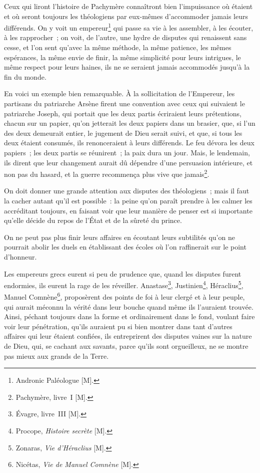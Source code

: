 \documentclass[french,twoside]{book} %
\begin{document}
Ceux qui liront l’histoire de Pachymère connaîtront bien l’impuissance où étaient et où seront toujours les théologiens par eux-mêmes d’accommoder jamais leurs différends. On y voit un empereur\footnote{Andronic Paléologue [M].} qui passe sa vie à les assembler, à les écouter, à les rapprocher ; on voit, de l’autre, une hydre de disputes qui renaissent sans cesse, et l’on sent qu’avec la même méthode, la même patience, les mêmes espérances, la même envie de finir, la même simplicité pour leurs intrigues, le même respect pour leurs haines, ils ne se seraient jamais accommodés jusqu’à la fin du monde.\par
En voici un exemple bien remarquable. À la sollicitation de l’Empereur, les partisans du patriarche Arsène firent une convention avec ceux qui suivaient le patriarche Joseph, qui portait que les deux partis écriraient leurs prétentions, chacun sur un papier, qu’on jetterait les deux papiers dans un brasier, que, si l’un des deux demeurait entier, le jugement de Dieu serait suivi, et que, si tous les deux étaient consumés, ils renonceraient à leurs différends. Le feu dévora les deux papiers ; les deux partis se réunirent ; la paix dura un jour. Mais, le lendemain, ils dirent que leur changement aurait dû dépendre d’une persuasion intérieure, et non pas du hasard, et la guerre recommença plus vive que jamais\footnote{Pachymère, livre I [M].}.\par
On doit donner une grande attention aux disputes des théologiens ; mais il faut la cacher autant qu’il est possible : la peine qu’on paraît prendre à les calmer les accréditant toujours, en faisant voir que leur manière de penser est si importante qu’elle décide du repos de l’État et de la sûreté du prince.\par
On ne peut pas plus finir leurs affaires en écoutant leurs subtilités qu’on ne pourrait abolir les duels en établissant des écoles où l’on raffinerait sur le point d’honneur.\par
Les empereurs grecs eurent si peu de prudence que, quand les disputes furent endormies, ils eurent la rage de les réveiller. Anastase\footnote{Évagre, livre III [M].}, Justinien\footnote{Procope, {\itshape Histoire secrète} [M].}, Héraclius\footnote{Zonaras, {\itshape Vie d’Héraclius} [M].}, Manuel Comnène\footnote{Nicétas, {\itshape Vie de Manuel Comnène} [M].}, proposèrent des points de foi à leur clergé et à leur peuple, qui aurait méconnu la vérité dans leur bouche quand même ils l’auraient trouvée. Ainsi, péchant toujours dans la forme et ordinairement dans le fond, voulant faire voir leur pénétration, qu’ils auraient pu si bien montrer dans tant d’autres affaires qui leur étaient confiées, ils entreprirent des disputes vaines sur la nature de Dieu, qui, se cachant aux savants, parce qu’ils sont orgueilleux, ne se montre pas mieux aux grands de la Terre.\par
\end{document}

